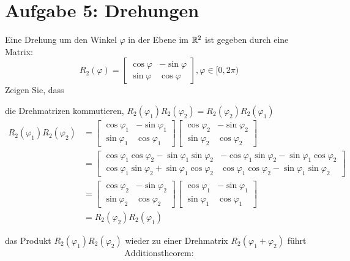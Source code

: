 \section{Aufgabe 5: Drehungen}
Eine Drehung um den Winkel $\varphi$ in der Ebene im $\mathbb{R}^2$ ist gegeben durch eine Matrix:
\[R_2(\varphi) = \begin{bmatrix}
\cos \varphi & -\sin \varphi\\
\sin \varphi & \cos \varphi
\end{bmatrix}, \varphi \in [0, 2\pi)\]
Zeigen Sie, dass
\begin{enumeralph}
	\item die Drehmatrizen kommutieren, $R_2(\varphi_1)R_2(\varphi_2) =R_2(\varphi_2)R_2(\varphi_1)$
	\begin{align*}
	R_2(\varphi_1)R_2(\varphi_2)&=\begin{bmatrix}
	\cos \varphi_1 & -\sin \varphi_1\\
	\sin \varphi_1 & \cos \varphi_1
	\end{bmatrix}\begin{bmatrix}
	\cos \varphi_2 & -\sin \varphi_2\\
	\sin \varphi_2 & \cos \varphi_2
	\end{bmatrix}\\
	&=\begin{bmatrix}
	\cos \varphi_1 \cos \varphi_2 - \sin \varphi_1 \sin \varphi_2 & -\cos \varphi_1 \sin \varphi_2 - \sin \varphi_1 \cos \varphi_2\\
	\cos \varphi_1 \sin \varphi_2 + \sin \varphi_1 \cos \varphi_2 &\cos \varphi_1 \cos \varphi_2 - \sin \varphi_1 \sin \varphi_2 
	\end{bmatrix}\\
	&=\begin{bmatrix}
		\cos \varphi_2 & -\sin \varphi_2\\
		\sin \varphi_2 & \cos \varphi_2
		\end{bmatrix}\begin{bmatrix}
		\cos \varphi_1 & -\sin \varphi_1\\
		\sin \varphi_1 & \cos \varphi_1
	\end{bmatrix}\\
	&=R_2(\varphi_2)R_2(\varphi_1)
	\end{align*}
	\item das Produkt $R_2(\varphi_1)R_2(\varphi_2)$ wieder zu einer Drehmatrix $R_2(\varphi_1+ \varphi_2)$ führt
	\begin{align*}
	\text{Additionstheorem:}\\

\end{align*}
\end{enumeralph}
